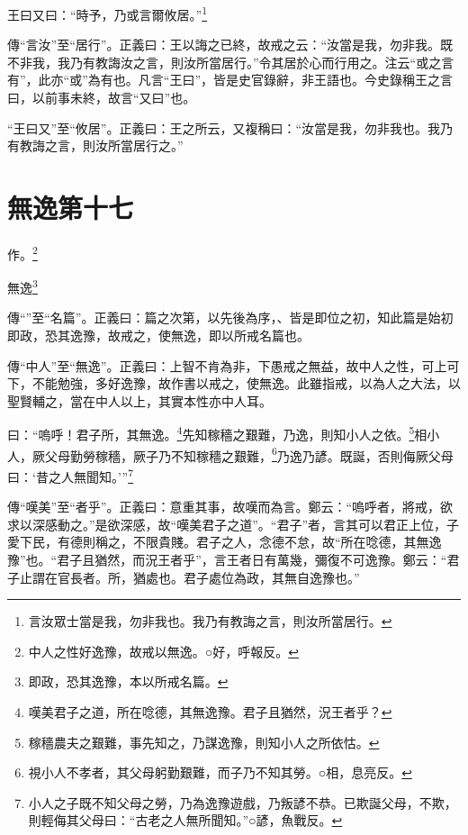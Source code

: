 王曰又曰：“時予，乃或言爾攸居。”\footnote{言汝眾士當是我，勿非我也。我乃有教誨之言，則汝所當居行。}


{\noindent\zhuan{}\fzbyks 傳“言汝”至“居行”。正義曰：王以誨之已終，故戒之云：“汝當是我，勿非我。既不非我，我乃有教誨汝之言，則汝所當居行。”令其居於心而行用之。注云“或之言有”，此亦“或”為有也。凡言“王曰”，皆是史官錄辭，非王語也。今史錄稱王之言曰，以前事未終，故言“又曰”也。 \par}

{\noindent\shu{}\fzkt “王曰又”至“攸居”。正義曰：王之所云，又複稱曰：“汝當是我，勿非我也。我乃有教誨之言，則汝所當居行之。” \par}

\section{無逸第十七}


作。\footnote{中人之性好逸豫，故戒以無逸。○好，呼報反。}

無逸\footnote{即政，恐其逸豫，本以所戒名篇。}


{\noindent\zhuan{}\fzbyks 傳“”至“名篇”。正義曰：篇之次第，以先後為序，、皆是即位之初，知此篇是始初即政，恐其逸豫，故戒之，使無逸，即以所戒名篇也。 \par}

{\noindent\shu{}\fzkt 傳“中人”至“無逸”。正義曰：上智不肯為非，下愚戒之無益，故中人之性，可上可下，不能勉強，多好逸豫，故作書以戒之，使無逸。此雖指戒，以為人之大法，以聖賢輔之，當在中人以上，其實本性亦中人耳。 \par}

曰：“嗚呼！君子所，其無逸。\footnote{嘆美君子之道，所在唸德，其無逸豫。君子且猶然，況王者乎？}先知稼穡之艱難，乃逸，則知小人之依。\footnote{稼穡農夫之艱難，事先知之，乃謀逸豫，則知小人之所依怙。}相小人，厥父母勤勞稼穡，厥子乃不知稼穡之艱難，\footnote{視小人不孝者，其父母躬勤艱難，而子乃不知其勞。○相，息亮反。}乃逸乃諺。既誕，否則侮厥父母曰：‘昔之人無聞知。’”\footnote{小人之子既不知父母之勞，乃為逸豫遊戲，乃叛諺不恭。已欺誕父母，不欺，則輕侮其父母曰：“古老之人無所聞知。”○諺，魚戰反。}


{\noindent\zhuan{}\fzbyks 傳“嘆美”至“者乎”。正義曰：意重其事，故嘆而為言。鄭云：“嗚呼者，將戒，欲求以深感動之。”是欲深感，故“嘆美君子之道”。“君子”者，言其可以君正上位，子愛下民，有德則稱之，不限貴賤。君子之人，念德不怠，故“所在唸德，其無逸豫”也。“君子且猶然，而況王者乎”，言王者日有萬幾，彌復不可逸豫。鄭云：“君子止謂在官長者。所，猶處也。君子處位為政，其無自逸豫也。” \par}

